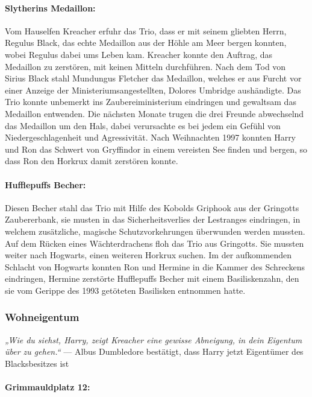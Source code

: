 \documentclass[a4paper, 10pt]{article}
\begin{document}
\paragraph{Slytherins Medaillon:}
Vom Hauselfen Kreacher erfuhr das Trio, dass er mit seinem gliebten Herrn, Regulus Black, das echte Medaillon aus der Höhle am Meer bergen konnten, wobei Regulus dabei ums Leben kam. Kreacher konnte den Auftrag, das Medaillon zu zerstören, mit keinen Mitteln durchführen. Nach dem Tod von Sirius Black stahl Mundungus Fletcher das Medaillon, welches er aus Furcht vor einer Anzeige der Ministeriumsangestellten, Dolores Umbridge aushändigte. Das Trio konnte unbemerkt ins Zaubereiministerium eindringen und gewaltsam das Medaillon entwenden. Die nächsten Monate trugen die drei Freunde abwechselnd das Medaillon um den Hals, dabei verursachte es bei jedem ein Gefühl von Niedergeschlagenheit und Agressivität. Nach Weihnachten 1997 konnten Harry und Ron das Schwert von Gryffindor in einem vereisten See finden und bergen, so dass Ron den Horkrux damit zerstören konnte.
\paragraph{Hufflepuffs Becher:}
Diesen Becher stahl das Trio mit Hilfe des Kobolds Griphook aus der Gringotts Zaubererbank, sie musten in das Sicherheitsverlies der Lestranges eindringen, in welchem zusätzliche, magische Schutzvorkehrungen überwunden werden mussten. Auf dem Rücken eines Wächterdrachens floh das Trio aus Gringotts. Sie mussten weiter nach Hogwarts, einen weiteren Horkrux suchen. Im der aufkommenden Schlacht von Hogwarts konnten Ron und Hermine in die Kammer des Schreckens eindringen, Hermine zerstörte Hufflepuffs Becher mit einem Basiliskenzahn, den sie vom Gerippe des 1993 getöteten Basilisken entnommen hatte.

\subsubsection*{\large Wohneigentum}
\textit{„Wie du siehst, Harry, zeigt Kreacher eine gewisse Abneigung, in dein Eigentum über zu gehen.“}
\vspace{10pt}
\newline
— Albus Dumbledore bestätigt, dass Harry jetzt Eigentümer des Blacksbesitzes ist
\vspace{10pt}
\newline
\paragraph{Grimmauldplatz 12:}
\end{document}
